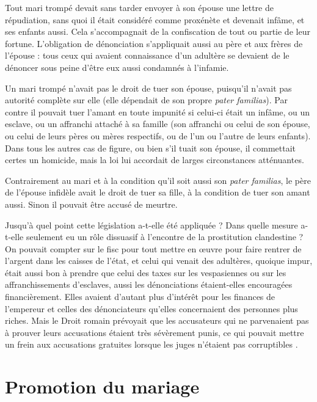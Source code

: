  Tout mari trompé devait sans tarder envoyer à son épouse une lettre de répudiation, sans quoi il était considéré comme proxénète et devenait infâme, et ses enfants aussi. Cela s'accompagnait de la confiscation de tout ou partie de leur fortune. L'obligation de dénonciation s'appliquait aussi au père et aux frères de l'épouse : tous ceux qui avaient connaissance d'un adultère se devaient de le dénoncer sous peine d'être eux aussi condamnés à l'infamie.

 Un mari trompé n'avait pas le droit de tuer son épouse, puisqu'il n'avait pas autorité complète sur elle (elle dépendait de son propre \emph{pater familias}). Par contre il pouvait tuer l'amant en toute impunité si celui-ci était un infâme, ou un esclave, ou un affranchi attaché à sa famille (son affranchi ou celui de son épouse, ou celui de leurs pères ou mères respectifs, ou de l'un ou l'autre de leurs enfants). Dans tous les autres cas de figure, ou bien s'il tuait son épouse, il commettait certes un homicide, mais la loi lui accordait de larges circonstances atténuantes. 

 Contrairement au mari et à la condition qu'il soit aussi son \emph{pater familias}, le père de l'épouse infidèle avait le droit de tuer sa fille, à la condition de tuer son amant aussi. Sinon il pouvait être accusé de meurtre.

 Jusqu'à quel point cette législation a-t-elle été appliquée ? Dans quelle mesure a-t-elle seulement eu un rôle dissuasif à l'encontre de la prostitution clandestine ? On pouvait compter sur le fisc pour tout mettre en œuvre pour faire rentrer de l'argent dans les caisses de l'état, et celui qui venait des adultères, quoique impur, était aussi bon à prendre que celui des taxes sur les vespasiennes ou sur les affranchissements d'esclaves, aussi les dénonciations étaient-elles encouragées financièrement. Elles avaient d'autant plus d'intérêt pour les finances de l'empereur et celles des dénonciateurs qu'elles concernaient des personnes plus riches. Mais le Droit romain prévoyait que les accusateurs qui ne parvenaient pas à prouver leurs accusations étaient très sévèrement punis, ce qui pouvait mettre un frein aux accusations gratuites lorsque les juges n'étaient pas corruptibles . 


\section{Promotion du mariage}


